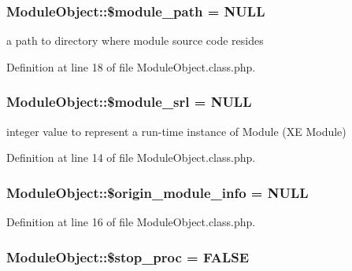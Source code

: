 \hypertarget{classModuleObject_aba24677d5cf457dc33d9af3d8a3b3a14}{
\subsubsection[{\$module\+\_\+path}]{\setlength{\rightskip}{0pt plus 5cm}Module\+Object\+::\$module\+\_\+path = N\+U\+L\+L}}\label{classModuleObject_aba24677d5cf457dc33d9af3d8a3b3a14}


a path to directory where module source code resides 



Definition at line 18 of file Module\+Object.\+class.\+php.

\hypertarget{classModuleObject_a0da50016ddc31513f563206fdf6f413d}{
\subsubsection[{\$module\+\_\+srl}]{\setlength{\rightskip}{0pt plus 5cm}Module\+Object\+::\$module\+\_\+srl = N\+U\+L\+L}}\label{classModuleObject_a0da50016ddc31513f563206fdf6f413d}


integer value to represent a run-\/time instance of Module (X\+E Module) 



Definition at line 14 of file Module\+Object.\+class.\+php.

\hypertarget{classModuleObject_a6bdf7982a5defc9d618c2dd1b700e876}{
\subsubsection[{\$origin\+\_\+module\+\_\+info}]{\setlength{\rightskip}{0pt plus 5cm}Module\+Object\+::\$origin\+\_\+module\+\_\+info = N\+U\+L\+L}}\label{classModuleObject_a6bdf7982a5defc9d618c2dd1b700e876}


Definition at line 16 of file Module\+Object.\+class.\+php.

\hypertarget{classModuleObject_ad4efa1b4c623247763e4d56f76c5fb1c}{
\subsubsection[{\$stop\+\_\+proc}]{\setlength{\rightskip}{0pt plus 5cm}Module\+Object\+::\$stop\+\_\+proc = F\+A\+L\+S\+E}}\label{classModuleObject_ad4efa1b4c623247763e4d56f76c5fb1c}


